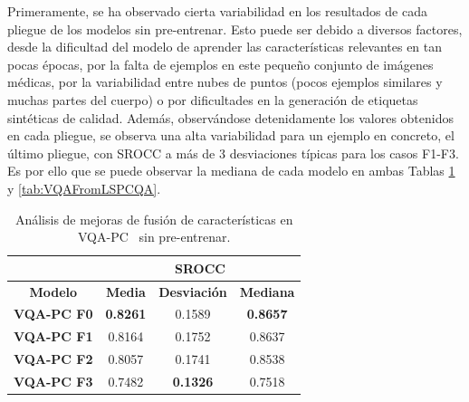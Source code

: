 Primeramente, se ha observado cierta 
variabilidad en los resultados de cada pliegue de los modelos sin pre-entrenar.
Esto puede ser debido a diversos factores, desde la dificultad del modelo de 
aprender las características relevantes en tan pocas épocas, por la falta 
de ejemplos en este pequeño conjunto de imágenes médicas, por la variabilidad 
entre nubes de puntos (pocos ejemplos similares y muchas partes del cuerpo) 
o por dificultades en la generación de etiquetas sintéticas de calidad. 
Además, observándose detenidamente los valores obtenidos en cada pliegue, 
se observa una alta variabilidad para un ejemplo en concreto, el último pliegue, 
con SROCC a más de 3 desviaciones típicas para los casos F1-F3.  Es por ello
que se puede observar la mediana de cada modelo en ambas Tablas \ref{tab:VQAFromScratch} y \ref{tab:VQAFromLSPCQA}.

\begin{table}[htp] 
  \scriptsize
  \centering
  \begin{tabular}{|c|c|c|c|}
\hline
\rowcolor[HTML]{FFC702}
                       & \multicolumn{3}{c|}{\textbf{SROCC}}                                                                                                          \\ \hline
\rowcolor[HTML]{FFC702}
\textbf{Modelo}        & \multicolumn{1}{c|}{\textbf{Media}} & \multicolumn{1}{c|}{\textbf{Desviación}} & \multicolumn{1}{c|}{\textbf{Mediana}} \\ \hline
\textbf{VQA-PC F0} & \multicolumn{1}{c|}{\textbf{0.8261}}   & \multicolumn{1}{c|}{0.1589}      & \multicolumn{1}{c|}{\textbf{0.8657}}      \\ \hline
\textbf{VQA-PC F1} & \multicolumn{1}{c|}{0.8164}   & \multicolumn{1}{c|}{0.1752}      & \multicolumn{1}{c|}{0.8637}      \\ \hline
\textbf{VQA-PC F2} & \multicolumn{1}{c|}{0.8057}   & \multicolumn{1}{c|}{0.1741}      & \multicolumn{1}{c|}{0.8538}      \\ \hline
\textbf{VQA-PC F3} & \multicolumn{1}{c|}{0.7482}   & \multicolumn{1}{c|}{\textbf{0.1326}}      & \multicolumn{1}{c|}{0.7518}      \\ \hline
  \end{tabular}
  \caption[Análisis de mejoras de fusión de características en VQA-PC sin pre-entrenar.]{
    Análisis de mejoras de fusión de características en VQA-PC~\cite{VQA-PC} sin pre-entrenar.
}
\label{tab:VQAFromScratch}
\end{table}

